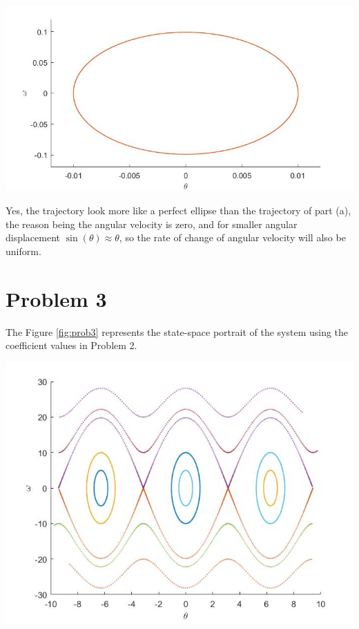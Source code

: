 \documentclass{article}
\begin{document}
\begin{enumerate}[label=(\alph*)]
\begin{minipage}{\linewidth}
{\includegraphics[scale=0.35]{images/prob2b.jpg}
\label{fig:prob2b}
}
\par\medskip
Yes, the trajectory look more like a perfect ellipse than the trajectory of part (a), the reason being the angular velocity is zero, and for smaller angular displacement $\sin(\theta) \approx \theta$, so the rate of change of angular velocity will also be uniform.
\end{minipage}
\end{enumerate}

\section*{Problem 3}
The Figure \ref{fig:prob3} represents the state-space portrait of the system using the coefficient values in Problem 2. \par\bigskip
\begin{minipage}{\linewidth}
{
\centering 
\includegraphics[scale=0.4]{images/prob3.jpg}
\label{fig:prob3}
}
\end{minipage}
\end{document}
